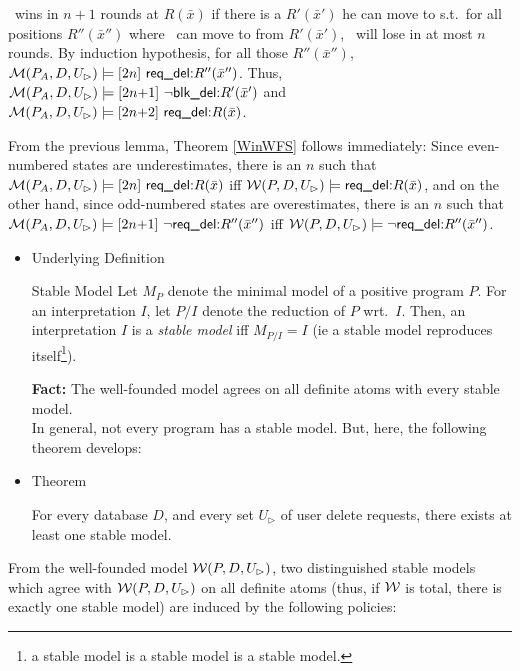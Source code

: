 \documentclass[twoside,11pt]{article}
\theoremstyle{lines}
\theoremstyle{longplain}
\def\rdel{\itorsf{req\_del:}}
\def\bdel{\itorsf{blk\_del:}}
\begin{document}
\begin{Proof}
\begin{Proof}
  \I\ wins in $n{+}1$ rounds at $R(\bar x)$ if there is a
 $R'(\bar x')$ he can move to s.t.\ for all positions $R''(\bar x'')$
  where  \II\ can move to from $R'(\bar x')$,  \II\ will lose
 in at most $n$ rounds.
 By induction hypothesis, for all those $R''(\bar x'')$,
 $\pl M(P_A,D,U_\rhd) \models \sterm{2n}\ \rdel R''(\bar x'')$.
 Thus,
 $\pl M(P_A,D,U_\rhd) \models \sterm{2n{+}1}\ \neg \bdel R'(\bar x')$
 and
 $\pl M(P_A,D,U_\rhd) \models \sterm{2n{+}2}\ \rdel R(\bar x)$.
\end{Proof}

\noindent From the previous lemma, Theorem \ref{WinWFS} follows immediately:
 Since even-numbered states are underestimates,
 there is an $n$ such that
 $\pl M(P_A,D,U_\rhd) \models \sterm{2n}\ \rdel R(\bar x)$ iff
 $\pl W(P,D,U_\rhd) \models \rdel R(\bar x)$, and
 on the other hand, since odd-numbered states are overestimates,
 there is an $n$ such that
 $\pl M(P_A,D,U_\rhd) \models \sterm{2n{+}1}\ \neg \rdel R''(\bar x'')$ iff
 $\pl W(P,D,U_\rhd) \models \neg \rdel R''(\bar x'')$.
\end{Proof}

\begin{itemize}
\item Underlying Definition
\begin{Definition}{Stable Model}
\cite{gelfond-lifschitz-ICLP-88,bidoit-froidevaux-TCS-91}
Let $M_P$ denote the minimal model of a positive program $P$.
For an interpretation $I$, let $P/I$ denote the reduction of $P$
wrt.\ $I$.
Then, an interpretation $I$ is a \emph{stable model} iff
$M_{P/I} = I$
(ie a stable model reproduces itself\footnote{a stable model is a stable
model is a stable model.}). 
\end{Definition}
\noindent
\textbf{Fact:} The well-founded model agrees on all definite atoms
with every stable model. \\
In general, not every program has a stable model. But, here,
the following theorem develops:

\item Theorem
\begin{Theorem}
For every database $D$, and every set $U_\rhd$ of user delete requests,
there exists at least one stable model.
\end{Theorem}
\end{itemize}

\noindent
From the well-founded model $\mathcal W(P,D,U_\rhd)$, two distinguished
stable models which agree with $\mathcal W(P,D,U_\rhd)$ on all definite
atoms (thus, if $\mathcal W$ is total, there is exactly one stable model)
are induced by the following policies:
\end{document}
